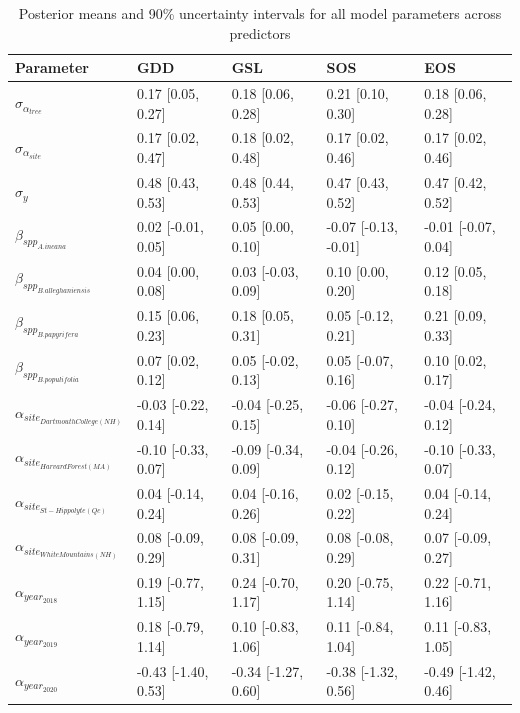 \documentclass{article}\usepackage[]{graphicx}\usepackage[]{xcolor}
\begin{document}
\begin{table}[ht]
\centering
\caption{Posterior means and 90\% uncertainty intervals for all model parameters across predictors} 
\label{tab:BAItab_all}
\begin{tabular}{lllll}
  \hline
Parameter & GDD & GSL & SOS & EOS \\ 
  \hline
$\sigma_{\alpha_{tree}}$ & 0.17 [0.05, 0.27] & 0.18 [0.06, 0.28] & 0.21 [0.10, 0.30] & 0.18 [0.06, 0.28] \\ 
  $\sigma_{\alpha_{site}}$ & 0.17 [0.02, 0.47] & 0.18 [0.02, 0.48] & 0.17 [0.02, 0.46] & 0.17 [0.02, 0.46] \\ 
  $\sigma_{y}$ & 0.48 [0.43, 0.53] & 0.48 [0.44, 0.53] & 0.47 [0.43, 0.52] & 0.47 [0.42, 0.52] \\ 
  $\beta_{spp_{A. incana}}$ & 0.02 [-0.01, 0.05] & 0.05 [0.00, 0.10] & -0.07 [-0.13, -0.01] & -0.01 [-0.07, 0.04] \\ 
  $\beta_{spp_{B. alleghaniensis}}$ & 0.04 [0.00, 0.08] & 0.03 [-0.03, 0.09] & 0.10 [0.00, 0.20] & 0.12 [0.05, 0.18] \\ 
  $\beta_{spp_{B. papyrifera}}$ & 0.15 [0.06, 0.23] & 0.18 [0.05, 0.31] & 0.05 [-0.12, 0.21] & 0.21 [0.09, 0.33] \\ 
  $\beta_{spp_{B. populifolia}}$ & 0.07 [0.02, 0.12] & 0.05 [-0.02, 0.13] & 0.05 [-0.07, 0.16] & 0.10 [0.02, 0.17] \\ 
  $\alpha_{site_{Dartmouth College (NH)}}$ & -0.03 [-0.22, 0.14] & -0.04 [-0.25, 0.15] & -0.06 [-0.27, 0.10] & -0.04 [-0.24, 0.12] \\ 
  $\alpha_{site_{Harvard Forest (MA)}}$ & -0.10 [-0.33, 0.07] & -0.09 [-0.34, 0.09] & -0.04 [-0.26, 0.12] & -0.10 [-0.33, 0.07] \\ 
  $\alpha_{site_{St-Hippolyte (Qc)}}$ & 0.04 [-0.14, 0.24] & 0.04 [-0.16, 0.26] & 0.02 [-0.15, 0.22] & 0.04 [-0.14, 0.24] \\ 
  $\alpha_{site_{White Mountains (NH)}}$ & 0.08 [-0.09, 0.29] & 0.08 [-0.09, 0.31] & 0.08 [-0.08, 0.29] & 0.07 [-0.09, 0.27] \\ 
  $\alpha_{year_{2018}}$ & 0.19 [-0.77, 1.15] & 0.24 [-0.70, 1.17] & 0.20 [-0.75, 1.14] & 0.22 [-0.71, 1.16] \\ 
  $\alpha_{year_{2019}}$ & 0.18 [-0.79, 1.14] & 0.10 [-0.83, 1.06] & 0.11 [-0.84, 1.04] & 0.11 [-0.83, 1.05] \\ 
  $\alpha_{year_{2020}}$ & -0.43 [-1.40, 0.53] & -0.34 [-1.27, 0.60] & -0.38 [-1.32, 0.56] & -0.49 [-1.42, 0.46] \\ 

\end{tabular}
\end{table}
\end{document}
